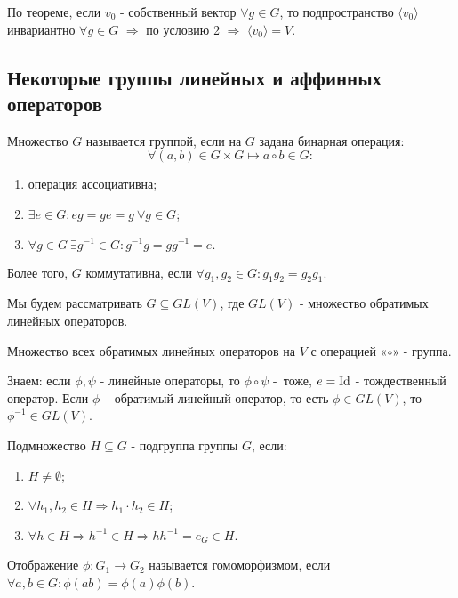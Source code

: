 По теореме, если $v_0$ - собственный вектор $\forall g \in G$, то подпространство $\langle v_0 \rangle$ инвариантно $\forall g \in G$ $\Longrightarrow$ по условию 2 $\Longrightarrow$ $\langle v_0 \rangle = V$.


\subsection{Некоторые группы линейных и аффинных операторов}
\begin{definition}
    Множество $G$ называется группой, если на $G$ задана бинарная операция:
    \[\forall (a,b) \in G \times G \longmapsto  a \circ b \in G:\]
    \begin{enumerate}
        \item операция ассоциативна;
        \item $\exists e \in G: eg = ge = g \ \forall g \in G$;
        \item $\forall g \in G \ \exists g^{-1} \in G: g^{-1}g = gg^{-1} = e.$
    \end{enumerate}
    Более того, $G$ коммутативна, если $\forall g_1, g_2 \in G: g_1g_2 = g_2g_1$.
\end{definition}

Мы будем рассматривать $G \subseteq GL(V)$, где $GL(V)$ - множество обратимых линейных операторов.
\begin{example1}
    Множество всех обратимых линейных операторов на $V$ с операцией «$\circ$» - группа.

    Знаем: если $\phi, \psi$ - линейные операторы, то $\phi \circ \psi$ - тоже, $e = \textup{Id}$ - тождественный оператор. Если $\phi$ - обратимый линейный оператор, то есть $\phi \in GL(V)$, то $\phi^{-1} \in GL(V)$.
\end{example1}

\begin{definition}
    Подмножество $H \subseteq G$ - подгруппа группы $G$, если:
    \begin{enumerate}
        \item $H \neq \emptyset$;
        \item $\forall h_1, h_2 \in H \Longrightarrow h_1 \cdot h_2 \in H$;
        \item $\forall h \in H \Longrightarrow h^{-1} \in H \Longrightarrow h h^{-1} = e_G \in H$.
    \end{enumerate}
\end{definition} 

\begin{definition}
    Отображение $\phi: G_1 \to G_2$ называется гомоморфизмом, если $\forall a,b \in G: \phi(ab) = \phi(a)\phi(b)$.
\end{definition} 

